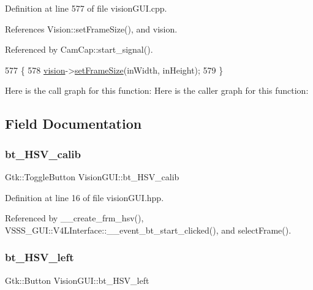 Definition at line 577 of file vision\+G\+U\+I.\+cpp.



References Vision\+::set\+Frame\+Size(), and vision.



Referenced by Cam\+Cap\+::start\+\_\+signal().


\begin{DoxyCode}
577                                                       \{
578     \hyperlink{class_vision_g_u_i_a36aba058af844ec6cbe0c945c616cd5f}{vision}->\hyperlink{class_vision_a363ee40ff45ed78c4895df2d42ef2d84}{setFrameSize}(inWidth, inHeight);
579 \}
\end{DoxyCode}
Here is the call graph for this function\+:
Here is the caller graph for this function\+:


\subsection{Field Documentation}
\mbox{\label{class_vision_g_u_i_a9506af83c1ee97d1b4f32b3fbb53fc48}} 
\subsubsection{\texorpdfstring{bt\+\_\+\+H\+S\+V\+\_\+calib}{bt\_HSV\_calib}}
{\footnotesize\ttfamily Gtk\+::\+Toggle\+Button Vision\+G\+U\+I\+::bt\+\_\+\+H\+S\+V\+\_\+calib}



Definition at line 16 of file vision\+G\+U\+I.\+hpp.



Referenced by \+\_\+\+\_\+create\+\_\+frm\+\_\+hsv(), V\+S\+S\+S\+\_\+\+G\+U\+I\+::\+V4\+L\+Interface\+::\+\_\+\+\_\+event\+\_\+bt\+\_\+start\+\_\+clicked(), and select\+Frame().

\mbox{\label{class_vision_g_u_i_a98323988d4a353190a02c827de0cecbf}} 
\subsubsection{\texorpdfstring{bt\+\_\+\+H\+S\+V\+\_\+left}{bt\_HSV\_left}}
{\footnotesize\ttfamily Gtk\+::\+Button Vision\+G\+U\+I\+::bt\+\_\+\+H\+S\+V\+\_\+left\hspace{0.3cm}{\ttfamily [private]}}



